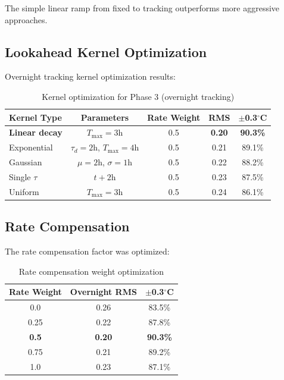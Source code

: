 \documentclass[11pt,letterpaper]{article}
\begin{document}
The simple linear ramp from fixed to tracking outperforms more aggressive approaches.

\subsection{Lookahead Kernel Optimization}

Overnight tracking kernel optimization results:

\begin{table}[H]
\centering
\caption{Kernel optimization for Phase 3 (overnight tracking)}
\begin{tabular}{lcccc}
\toprule
\textbf{Kernel Type} & \textbf{Parameters} & \textbf{Rate Weight} & \textbf{RMS} & \textbf{$\pm$0.3$^\circ$C} \\
\midrule
\textbf{Linear decay} & $T_{\max}=3$h & 0.5 & \textbf{0.20} & \textbf{90.3\%} \\
Exponential & $\tau_d=2$h, $T_{\max}=4$h & 0.5 & 0.21 & 89.1\% \\
Gaussian & $\mu=2$h, $\sigma=1$h & 0.5 & 0.22 & 88.2\% \\
Single $\tau$ & $t+2$h & 0.5 & 0.23 & 87.5\% \\
Uniform & $T_{\max}=3$h & 0.5 & 0.24 & 86.1\% \\
\bottomrule
\end{tabular}
\end{table}

\subsection{Rate Compensation}

The rate compensation factor was optimized:

\begin{table}[H]
\centering
\caption{Rate compensation weight optimization}
\begin{tabular}{ccc}
\toprule
\textbf{Rate Weight} & \textbf{Overnight RMS} & \textbf{$\pm$0.3$^\circ$C} \\
\midrule
0.0 & 0.26 & 83.5\% \\
0.25 & 0.22 & 87.8\% \\
\textbf{0.5} & \textbf{0.20} & \textbf{90.3\%} \\
0.75 & 0.21 & 89.2\% \\
1.0 & 0.23 & 87.1\% \\
\bottomrule
\end{tabular}
\end{table}
\end{document}
